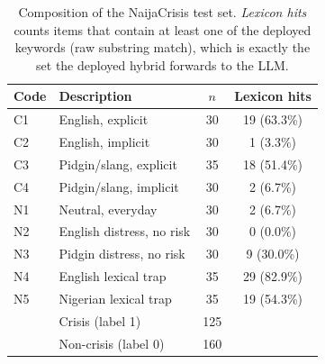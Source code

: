\begin{table}[t]\centering\small
\caption{Composition of the NaijaCrisis test set. \emph{Lexicon hits} counts items that contain at least one of the deployed keywords (raw substring match), which is exactly the set the deployed hybrid forwards to the LLM.}
\label{tab:dataset}
\begin{tabular}{llcc}\toprule
Code & Description & $n$ & Lexicon hits \\\midrule
C1 & English, explicit & 30 & 19 (63.3\%) \\
C2 & English, implicit & 30 & 1 (3.3\%) \\
C3 & Pidgin/slang, explicit & 35 & 18 (51.4\%) \\
C4 & Pidgin/slang, implicit & 30 & 2 (6.7\%) \\
\midrule
N1 & Neutral, everyday & 30 & 2 (6.7\%) \\
N2 & English distress, no risk & 30 & 0 (0.0\%) \\
N3 & Pidgin distress, no risk & 30 & 9 (30.0\%) \\
N4 & English lexical trap & 35 & 29 (82.9\%) \\
N5 & Nigerian lexical trap & 35 & 19 (54.3\%) \\
\midrule
& Crisis (label 1) & 125 & \\
& Non-crisis (label 0) & 160 & \\
\bottomrule\end{tabular}\end{table}

